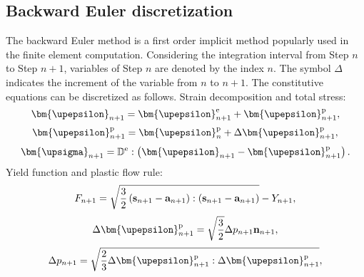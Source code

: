 \subsection{Backward Euler discretization}
\noindent
The backward Euler method is a first order implicit method popularly used in the finite element computation. Considering the integration interval from Step $n$ to Step $n+1$, variables of Step $n$ are denoted by the index $n$. The symbol $\Delta$ indicates the increment of the variable from $n$ to $n+1$. The constitutive equations can be discretized as follows.
Strain decomposition and total stress:
\begin{equation}
{{\bm{\upepsilon }}_{n + 1}} = {\bm{\upepsilon }}_{n + 1}^{\rm{e}} + {\bm{\upepsilon }}_{n + 1}^{\rm{p}},
\end{equation}
\begin{equation}
{\bm{\upepsilon }}_{n + 1}^{\rm{p}} = {\bm{\upepsilon }}_n^{\rm{p}} + \Delta {\bm{\upepsilon }}_{n + 1}^{\rm{p}},
\end{equation}
\begin{equation}
\label{Equ:sigman+1}
{{\bm{\upsigma }}_{n + 1}} = {\mathbb{D}^{\rm{e}}}:\left( {{{\bm{\upepsilon }}_{n + 1}} - {\bm{\upepsilon }}_{n + 1}^{\rm{p}}} \right).
\end{equation}
Yield function and plastic flow rule:
\begin{equation}
\label{Equ:Fn+1}
{F_{n + 1}} = \sqrt {\frac{3}{2}\left( {{{\bf{s}}_{n + 1}} - {{\bf{a}}_{n + 1}}} \right):\left( {{{\bf{s}}_{n + 1}} - {{\bf{a}}_{n + 1}}} \right)}  - {Y_{n + 1}},
\end{equation}
\begin{equation}
\label{Equ:epsilonpn+1}
\Delta {\bm{\upepsilon }}_{n + 1}^{\rm{p}} = \sqrt {\frac{3}{2}} \Delta {p_{n + 1}}{{\bf{n}}_{n + 1}},
\end{equation}
\begin{equation}
\label{Equ:pn+1}
\Delta {p_{n + 1}} = \sqrt {\frac{2}{3}\Delta {\bm{\upepsilon }}_{n + 1}^{\rm{p}}:\Delta {\bm{\upepsilon }}_{n + 1}^{\rm{p}}},
\end{equation}
